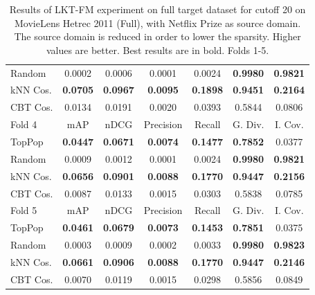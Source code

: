 \begin{table}[hbt]
\begin{tabulary}{\textwidth}{|L|CCCCCC|}
Random & 0.0002 &           0.0006 &           0.0001 &           0.0024 &                                  \textbf{0.9980} &                                   \textbf{0.9821} \\
kNN Cos. & \textbf{0.0705} &  \textbf{0.0967} &  \textbf{0.0095} &  \textbf{0.1898} &                                  \textbf{0.9451} &                                   \textbf{0.2164} \\
CBT Cos. & 0.0134 &           0.0191 &           0.0020 &           0.0393 &                                           0.5844 &                                            0.0806 \\
\hline
\hline
Fold 4 & mAP & nDCG & Precision & Recall & G. Div. & I. Cov. \\
\hline
TopPop & \textbf{0.0447} &  \textbf{0.0671} &  \textbf{0.0074} &  \textbf{0.1477} &                                  \textbf{0.7852} &                                            0.0377 \\
Random & 0.0009 &           0.0012 &           0.0001 &           0.0024 &                                  \textbf{0.9980} &                                   \textbf{0.9821} \\
kNN Cos. & \textbf{0.0656} &  \textbf{0.0901} &  \textbf{0.0088} &  \textbf{0.1770} &                                  \textbf{0.9447} &                                   \textbf{0.2156} \\
CBT Cos. & 0.0087 &           0.0133 &           0.0015 &           0.0303 &                                           0.5838 &                                            0.0785 \\
\hline
\hline
Fold 5 & mAP & nDCG & Precision & Recall & G. Div. & I. Cov. \\
\hline
TopPop & \textbf{0.0461} &  \textbf{0.0679} &  \textbf{0.0073} &  \textbf{0.1453} &                                  \textbf{0.7851} &                                            0.0375 \\
Random & 0.0003 &           0.0009 &           0.0002 &           0.0033 &                                  \textbf{0.9980} &                                   \textbf{0.9823} \\
kNN Cos. & \textbf{0.0661} &  \textbf{0.0906} &  \textbf{0.0088} &  \textbf{0.1770} &                                  \textbf{0.9447} &                                   \textbf{0.2146} \\
CBT Cos. & 0.0070 &           0.0119 &           0.0015 &           0.0298 &                                           0.5856 &                                            0.0849 \\
\hline
\end{tabulary}
\caption{Results of LKT-FM experiment on full target dataset for cutoff 20 on MovieLens Hetrec 2011 (Full), with Netflix Prize as source domain. The source domain is reduced in order to lower the sparsity. Higher values are better. Best results are in bold. Folds 1-5.}
\end{table}

